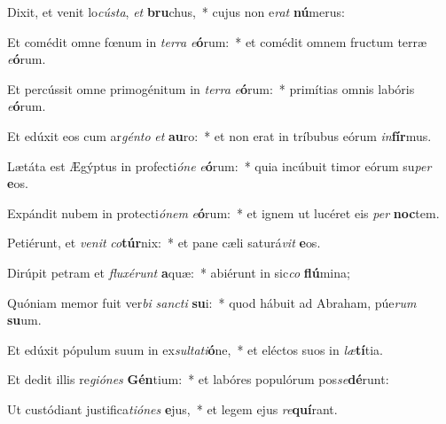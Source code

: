 \item Dixit, et venit lo\textit{cús}\textit{ta}, \textit{et} \textbf{bru}chus,~* cujus non e\textit{rat} \textbf{nú}merus:
\item Et comédit omne fœnum in \textit{ter}\textit{ra} \textit{e}\textbf{ó}rum:~* et comédit omnem fructum terræ \textit{e}\textbf{ó}rum.
\item Et percússit omne primogénitum in \textit{ter}\textit{ra} \textit{e}\textbf{ó}rum:~* primítias omnis labóris \textit{e}\textbf{ó}rum.
\item Et edúxit eos cum ar\textit{gén}\textit{to} \textit{et} \textbf{au}ro:~* et non erat in tríbubus eórum \textit{in}\textbf{fír}mus.
\item Lætáta est Ægýptus in profecti\textit{ó}\textit{ne} \textit{e}\textbf{ó}rum:~* quia incúbuit timor eórum su\textit{per} \textbf{e}os.
\item Expándit nubem in protecti\textit{ó}\textit{nem} \textit{e}\textbf{ó}rum:~* et ignem ut lucéret eis \textit{per} \textbf{noc}tem.
\item Petiérunt, et \textit{ve}\textit{nit} \textit{co}\textbf{túr}nix:~* et pane cæli saturá\textit{vit} \textbf{e}os.
\item Dirúpit petram et \textit{flu}\textit{xé}\textit{runt} \textbf{a}quæ:~* abiérunt in sic\textit{co} \textbf{flú}mina;
\item Quóniam memor fuit ver\textit{bi} \textit{sanc}\textit{ti} \textbf{su}i:~* quod hábuit ad Abraham, púe\textit{rum} \textbf{su}um.
\item Et edúxit pópulum suum in ex\textit{sul}\textit{ta}\textit{ti}\textbf{ó}ne,~* et eléctos suos in \textit{læ}\textbf{tí}tia.
\item Et dedit illis re\textit{gi}\textit{ó}\textit{nes} \textbf{Gén}tium:~* et labóres populórum pos\textit{se}\textbf{dé}runt:
\item Ut custódiant justifica\textit{ti}\textit{ó}\textit{nes} \textbf{e}jus,~* et legem ejus \textit{re}\textbf{quí}rant.
